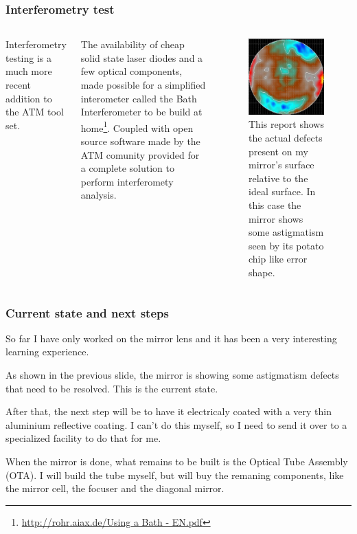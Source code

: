 \documentclass{beamer}
\begin{document}
\begin{frame}
\frametitle{Interferometry test}
\begin{columns}
Interferometry testing is a much more recent addition to the ATM tool set.

The availability of cheap solid state laser diodes and a few optical components, made possible for a simplified interometer called the Bath Interferometer to be build at home\footnote[frame]{\url{http://rohr.aiax.de/Using a Bath - EN.pdf}}. Coupled with open source software made by the ATM comunity provided for a complete solution to perform interferomety analysis.
\begin{figure}
\includegraphics[scale=0.3]{assets/bath.jpg}
\caption{This report shows the actual defects present on my mirror's surface relative to the ideal surface. In this case the mirror shows some astigmatism seen by its potato chip like error shape.}
\end{figure}
\end{columns}
\end{frame}


\begin{frame}
\frametitle{Current state and next steps}
So far I have only worked on the mirror lens and it has been a very interesting learning experience.

As shown in the previous slide, the mirror is showing some astigmatism defects that need to be resolved. This is the current state.

After that, the next step will be to have it electricaly coated with a very thin aluminium reflective coating. I can't do this myself, so I need to send it over to a specialized facility to do that for me.

When the mirror is done, what remains to be built is the Optical Tube Assembly (OTA). I will build the tube myself, but will buy the remaning components, like the mirror cell, the focuser and the diagonal mirror.
\end{frame}
\end{document}
